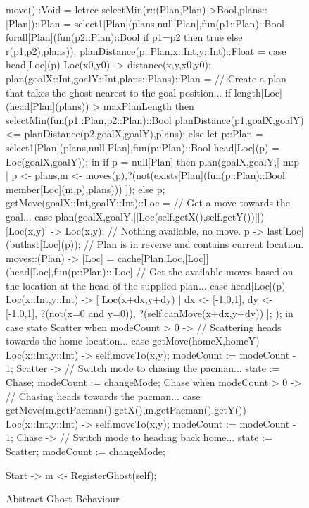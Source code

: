\documentclass[5p,times]{elsarticle}
\begin{document}
\begin{figure}
\begin{ESL}
{  move()::Void = 
    letrec 
      selectMin(r::(Plan,Plan)->Bool,plans::[Plan])::Plan = 
        select1[Plan](plans,null[Plan],fun(p1::Plan)::Bool 
          forall[Plan](fun(p2::Plan)::Bool if p1=p2 then true else r(p1,p2),plans));
      planDistance(p::Plan,x::Int,y::Int)::Float = case head[Loc](p) { Loc(x0,y0) -> distance(x,y,x0,y0); }
      plan(goalX::Int,goalY::Int,plans::Plans)::Plan = 
        // Create a plan that takes the ghost nearest to the goal position...
        if length[Loc](head[Plan](plans)) > maxPlanLength
        then 
          selectMin(fun(p1::Plan,p2::Plan)::Bool planDistance(p1,goalX,goalY) <= planDistance(p2,goalX,goalY),plans);
        else 
          let p::Plan = select1[Plan](plans,null[Plan],fun(p::Plan)::Bool head[Loc](p) = Loc(goalX,goalY));
          in if p = null[Plan]
             then plan(goalX,goalY,[ m:p | 
               p <- plans,m <- moves(p),?(not(exists[Plan](fun(p::Plan)::Bool member[Loc](m,p),plans))) ]);
             else p;
      getMove(goalX::Int,goalY::Int)::Loc = 
        // Get a move towards the goal...
        case plan(goalX,goalY,[[Loc(self.getX(),self.getY())]]) {
          [Loc(x,y)] -> Loc(x,y);           // Nothing available, no move.
          p -> last[Loc](butlast[Loc](p));  // Plan is in reverse and contains current location.
        }
      moves::(Plan) -> [Loc] = cache[Plan,Loc,[Loc]](head[Loc],fun(p::Plan)::[Loc] 
        // Get the available moves based on the location at the head of the supplied plan...
        case head[Loc](p) {
          Loc(x::Int,y::Int) -> 
            [ Loc(x+dx,y+dy) | dx <- [-1,0,1], dy <- [-1,0,1], ?(not(x=0 and y=0)), ?(self.canMove(x+dx,y+dy)) ];
        });
    in {
      case state {
        Scatter when modeCount > 0 ->  // Scattering heads towards the home location...
          case getMove(homeX,homeY) {
            Loc(x::Int,y::Int) -> {
              self.moveTo(x,y);
              modeCount := modeCount - 1;
            }
          }
        Scatter -> { // Switch mode to chasing the pacman...
          state := Chase;
          modeCount := changeMode;
        }
        Chase when modeCount > 0 ->  // Chasing heads towards the pacman...
          case getMove(m.getPacman().getX(),m.getPacman().getY()) {
            Loc(x::Int,y::Int) -> {
              self.moveTo(x,y);
              modeCount := modeCount - 1;
            }
         }
        Chase -> { // Switch mode to heading back home...
          state := Scatter;
          modeCount := changeMode;
        }
      }
    }

  Start -> 
    m <- RegisterGhost(self);
}
\end{ESL}
\caption{Abstract Ghost Behaviour}
\label{fig:abstract_ghost}
\end{figure}
\end{document}
